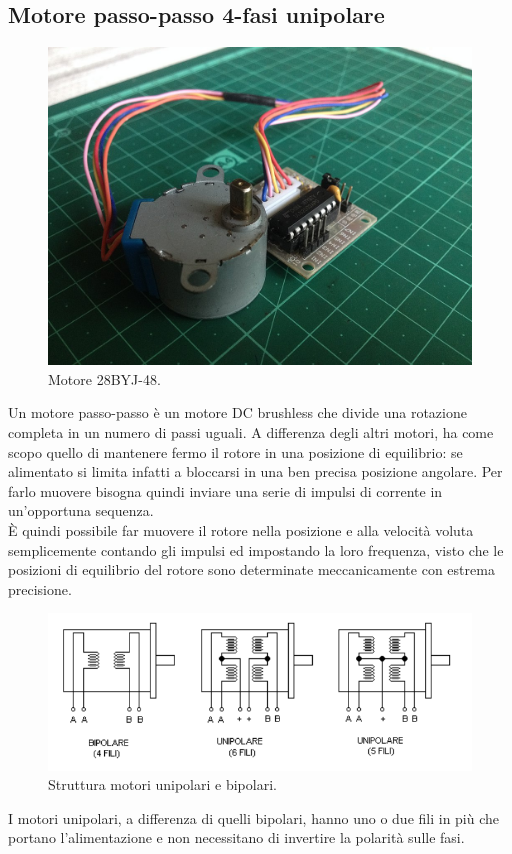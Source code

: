 \documentclass[12pt,oneside,a4paper]{article}
\begin{document}
\subsection{Motore passo-passo 4-fasi unipolare}

\begin{figure}[!htb]
    \centering
    \includegraphics[width=0.4\linewidth]{figures/motor28BYJ-48.jpg}
    \caption{Motore 28BYJ-48.}
\end{figure}
Un motore passo-passo\cite{StepMotor} è un motore DC brushless che divide una rotazione completa in un numero di passi uguali.
A differenza degli altri motori, ha come scopo quello di mantenere fermo il rotore in una posizione di equilibrio: se alimentato si limita infatti a bloccarsi in una ben precisa posizione angolare. Per farlo muovere bisogna quindi inviare una serie di impulsi di corrente in un'opportuna sequenza.
\\È quindi possibile far muovere il rotore nella posizione e alla velocità voluta semplicemente contando gli impulsi ed impostando la loro frequenza, visto che le posizioni di equilibrio del rotore sono determinate meccanicamente con estrema precisione.

\begin{figure}[!htb]
    \centering
    \includegraphics[width=0.8\linewidth]{figures/unipolare-bipolare.png}
    \caption{Struttura motori unipolari e bipolari.}
\end{figure}

I motori unipolari, a differenza di quelli bipolari, hanno uno o due fili in più che portano l'alimentazione e non necessitano di invertire la polarità sulle fasi.
\end{document}
